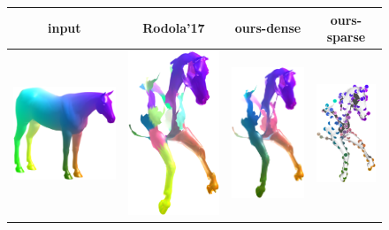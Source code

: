 \begin{figure}[b!]
	\centering
	\setlength\tabcolsep{2pt}
	\begin{tabular}[width=0.8\textwidth]{c|ccc}
		input &  Rodola'17\cite{rodola2017partial} & ours-dense & ours-sparse
		\\ \hline
		\includegraphics[scale=0.5]{figures/horse_base.png} & \includegraphics[scale=0.5]{figures/holes_horse_12_PFM.png}  & \includegraphics[scale=0.5]{figures/holes_horse_12.png} & \includegraphics[scale=0.48]{figures/holes_horse_12_sparse.png}\\

\end{tabular}
\end{figure}
